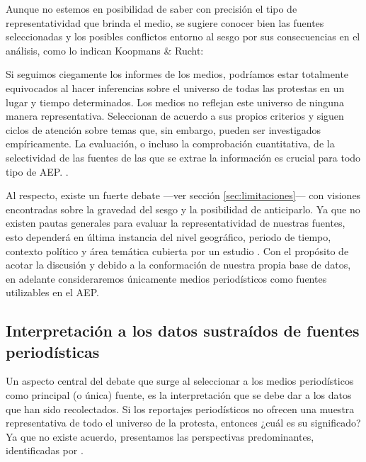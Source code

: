 \documentclass[letterpaper, 11pt]{book}
\theoremstyle{definition}
\theoremstyle{remark}
\begin{document}
Aunque no estemos en posibilidad de saber con precisión el tipo de representatividad que brinda el medio, se sugiere conocer bien las fuentes seleccionadas y los posibles conflictos entorno al sesgo por sus consecuencias en el análisis, como lo indican Koopmans \& Rucht:

\begin{center}
    \begin{minipage}{0.9\linewidth}
        {\setlength{\parindent}{12pt}\small
        Si seguimos ciegamente los informes de los medios, podríamos estar totalmente equivocados al hacer inferencias sobre el universo de todas las protestas en un lugar y tiempo determinados. 
        Los medios no reflejan este universo de ninguna manera representativa. Seleccionan de acuerdo a sus propios criterios y siguen ciclos de atención sobre temas que, sin embargo, pueden ser investigados empíricamente. 
        La evaluación, o  incluso la comprobación cuantitativa, de la selectividad de las fuentes de las que se extrae la información es crucial para todo tipo de AEP. \normalsize \citep[246]{2002_Koopmans_AEP}.
        }
    \end{minipage}
\end{center}


Al respecto, existe un fuerte debate ---ver sección \ref{sec:limitaciones}--- con visiones encontradas sobre la gravedad del sesgo y la posibilidad de anticiparlo. 
Ya que no existen pautas generales para evaluar la representatividad de nuestras fuentes, esto dependerá en última instancia del nivel geográfico, periodo de tiempo, contexto político y área temática cubierta por un estudio \citep[439]{2014_Hutter_AEP}. 
Con el propósito de acotar la discusión y debido a la conformación de nuestra propia base de datos, en adelante consideraremos únicamente medios periodísticos como fuentes utilizables en el AEP.



\subsection{Interpretación a los datos sustraídos de fuentes periodísticas}
\label{sec:Interpretacion_fuentes}

Un aspecto central del debate que surge al seleccionar a los medios periodísticos como principal (o única) fuente, es la interpretación que se debe dar a los datos que han sido recolectados. 
Si los reportajes periodísticos no ofrecen una muestra representativa de todo el universo de la protesta, entonces ¿cuál es su significado? Ya que no existe acuerdo, presentamos las perspectivas predominantes, identificadas por \citet{2003_Wada_Tesis}.
\end{document}
